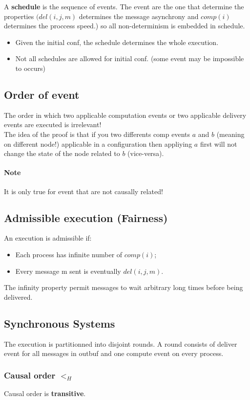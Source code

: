A \textbf{schedule} is the sequence of events. The event are the
one that determine the properties $(del(i,j,m)$ determines the message
asynchrony and $comp(i)$ determines the proccess speed.)
 so all non-determinism is embedded in schedule.

\begin{itemize}
	 \item Given the initial conf, the schedule determines the whole
	 execution.
	 \item Not all schedules are allowed for initial conf. (some
	 event may be impossible to occurs)
\end{itemize}

\subsection{Order of event}
The order in which two applicable computation events or
two applicable delivery events are executed is irrelevant!\\
The idea of the proof is that if you two differents comp
events $a$ and $b$ (meaning on different node!) applicable in a
configuration then appliying $a$ first will not change the state of the
node related to $b$ (vice-versa).
\paragraph{Note} It is only true for event that are not causally
related!
\subsection{Admissible execution (Fairness)}
An execution is admissible if:
\begin{itemize}
	\item Each process has infinite number of $comp(i)$;
	\item Every message m sent is eventually $del(i,j,m)$.
\end{itemize}
The infinity property permit messages to wait arbitrary long times before
being delivered.
\subsection{Synchronous Systems}
The execution is partitionned into disjoint rounds. A round consists of
deliver event for all messages in outbuf and one compute event on
every process.

\subsubsection{Causal order $<_H$}
Causal order is \textbf{transitive}.

